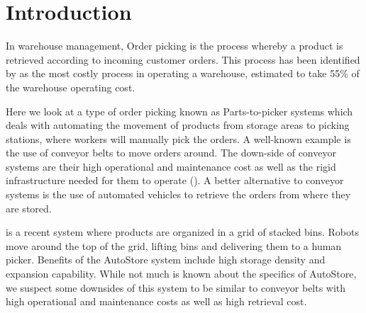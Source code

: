 \documentclass[a4paper,11pt]{article}
\begin{document}
\section{Introduction}


In warehouse management, Order picking is the process whereby a product is retrieved according to incoming customer orders. This process has been identified by \cite{de2007design} as the most costly process in operating a warehouse, estimated to take 55\% of the warehouse operating cost.

Here we look at a type of order picking known as Parts-to-picker systems which deals with automating the movement of products from storage areas to picking stations, where workers will manually pick the orders. A well-known example is the use of conveyor belts to move orders around. The down-side of conveyor systems are their high operational and maintenance cost as well as the rigid infrastructure needed for them to operate (\cite{wurman2008coordinating}). A better alternative to conveyor systems is the use of automated vehicles to retrieve the orders from where they are stored.

\cite{introduction2015autostore} is a recent system where products are organized in a grid of stacked bins. Robots move around the top of the grid, lifting bins and delivering them to a human picker. Benefits of the AutoStore system include high storage density and expansion capability. While not much is known about the specifics of AutoStore, we suspect some downsides of this system to be similar to conveyor belts with high operational and maintenance costs as well as high retrieval cost.
\end{document}
